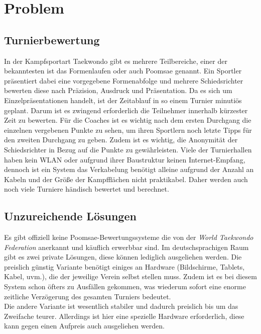 \section{Problem}
\subsection{Turnierbewertung}
In der Kampfsportart Taekwondo gibt es mehrere Teilbereiche, einer der bekanntesten ist das Formenlaufen oder auch Poomsae genannt.
Ein Sportler präsentiert dabei eine vorgegebene Formenabfolge und mehrere Schiedsrichter bewerten diese nach
Präzision, Ausdruck und Präsentation.
Da es sich um Einzelpräsentationen handelt, ist der Zeitablauf in so einem Turnier minutiös geplant.
Darum ist es zwingend erforderlich die Teilnehmer innerhalb kürzester Zeit zu bewerten.
Für die Coaches ist es wichtig nach dem ersten Durchgang die einzelnen vergebenen Punkte zu sehen, um ihren Sportlern
    noch letzte Tipps für den zweiten Durchgang zu geben.
Zudem ist es wichtig, die Anonymität der Schiedsrichter in Bezug auf die Punkte zu gewährleisten.
Viele der Turnierhallen haben kein WLAN oder aufgrund ihrer Baustruktur keinen Internet-Empfang, dennoch ist ein System
das Verkabelung benötigt alleine aufgrund der Anzahl an Kabeln und der Größe der Kampfflächen nicht praktikabel.
Daher werden auch noch viele Turniere händisch bewertet und berechnet.
	
\subsection{Unzureichende Lösungen}
Es gibt offiziell keine Poomsae-Bewertungssysteme die von der \emph{World Taekwondo Federation} anerkannt und käuflich erwerbbar sind.
Im deutschsprachigen Raum gibt es zwei private Lösungen, diese können lediglich ausgeliehen werden.
Die preislich günstig Variante benötigt einiges an Hardware (Bildschirme, Tablets, Kabel, uvm.), die der jeweilige Verein selbst stellen muss.
Zudem ist es bei diesem System schon öfters zu Ausfällen gekommen, was wiederum sofort eine enorme zeitliche
Verzögerung des gesamten Turniers bedeutet.
\\
Die andere Variante ist wesentlich stabiler und dadurch preislich bis um das Zweifache teurer.
Allerdings ist hier eine spezielle Hardware erforderlich, diese kann gegen einen Aufpreis auch ausgeliehen werden.

